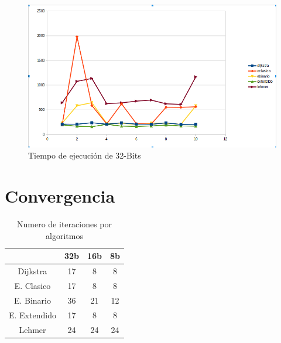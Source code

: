 \begin{figure}[H]
 \centering
 \includegraphics[scale=0.4]{./32bits.png}
 \caption{Tiempo de ejecución de 32-Bits}
 \label{fig:1}
\end{figure}



\section{Convergencia}

\begin{table}[H]
\label{tablax}
\begin{center}
\begin{tabular}{|c|c|c|c|}
\hline 
 &32b&16b&8b \\
\hline
Dijkstra& 17 & 8 & 8 \\ \hline
E. Clasico& 17& 8 & 8 \\ \hline
E. Binario& 36 & 21 & 12 \\ \hline
E. Extendido& 17 & 8 & 8 \\ \hline
Lehmer& 24 & 24 & 24 \\ \hline
\end{tabular}
\end{center}
\caption{Numero de iteraciones por algoritmos}
\end{table}

